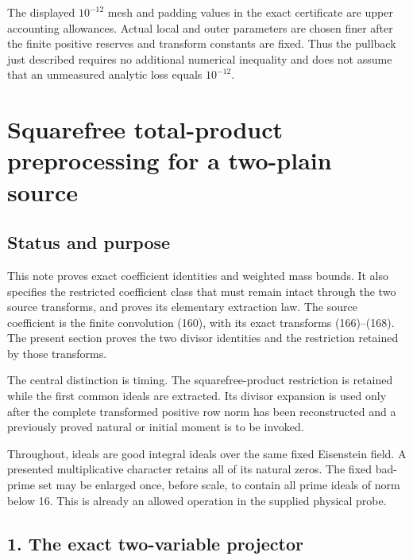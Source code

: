 The displayed \(10^{-12}\) mesh and padding values in the exact certificate are upper accounting allowances. Actual local and outer parameters are chosen finer after the finite positive reserves and transform constants are fixed. Thus the pullback just described requires no additional numerical inequality and does not assume that an unmeasured analytic loss equals \(10^{-12}\).

\hypertarget{sources:squarefree-total-product-preprocessing-for-a-two-plain-source}{%
\section{Squarefree total-product preprocessing for a two-plain source}\label{sources:squarefree-total-product-preprocessing-for-a-two-plain-source}}

\hypertarget{sources:status-and-purpose}{%
\subsection{Status and purpose}\label{sources:status-and-purpose}}

This note proves exact coefficient identities and weighted mass bounds. It also specifies the restricted coefficient class that must remain intact through the two source transforms, and proves its elementary extraction law. The source coefficient is the finite convolution (160), with its exact transforms (166)--(168). The present section proves the two divisor identities and the restriction retained by those transforms.

The central distinction is timing. The squarefree-product restriction is retained while the first common ideals are extracted. Its divisor expansion is used only after the complete transformed positive row norm has been reconstructed and a previously proved natural or initial moment is to be invoked.

Throughout, ideals are good integral ideals over the same fixed Eisenstein field. A presented multiplicative character retains all of its natural zeros. The fixed bad-prime set may be enlarged once, before scale, to contain all prime ideals of norm below 16. This is already an allowed operation in the supplied physical probe.

\hypertarget{sources:the-exact-two-variable-projector}{%
\subsection{1. The exact two-variable projector}\label{sources:the-exact-two-variable-projector}}

